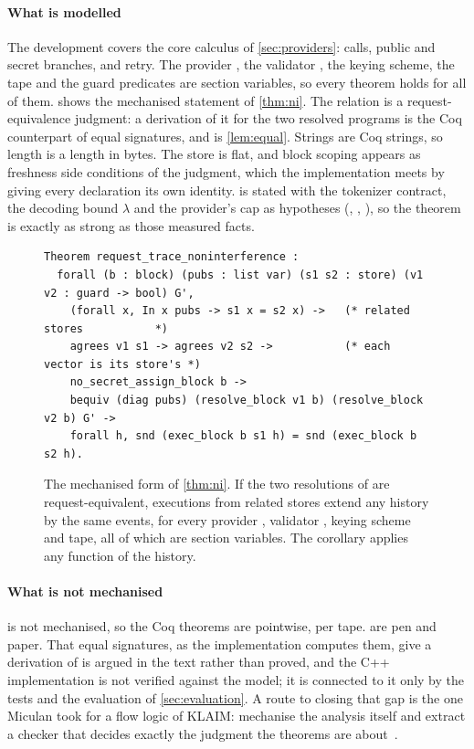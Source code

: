 \paragraph{What is modelled} The development covers the core calculus of
\cref{sec:providers}: calls, public and secret branches, and retry. The provider
, the validator , the keying scheme, the tape and the guard
predicates are section variables, so every theorem holds for all of them.
 shows the mechanised statement of \cref{thm:ni}. The relation
 is a request-equivalence judgment: a derivation of it for the two
resolved programs is the Coq counterpart of equal signatures, and
 is \cref{lem:equal}. Strings are Coq strings, so length is a length
in bytes. The store is flat, and block scoping appears as freshness side conditions
of the judgment, which the implementation meets by giving every declaration its own
identity.  is stated with the tokenizer contract, the decoding bound
$\lambda$ and the provider's cap as hypotheses (, ,
), so the theorem is exactly as strong as those measured facts.

\begin{figure}[t]
\begin{lstlisting}[language={},numbers=none,xleftmargin=0pt,basicstyle=\ttfamily\scriptsize,
  morekeywords={Theorem,forall,Proof,Qed}]
Theorem request_trace_noninterference :
  forall (b : block) (pubs : list var) (s1 s2 : store) (v1 v2 : guard -> bool) G',
    (forall x, In x pubs -> s1 x = s2 x) ->   (* related stores           *)
    agrees v1 s1 -> agrees v2 s2 ->           (* each vector is its store's *)
    no_secret_assign_block b ->
    bequiv (diag pubs) (resolve_block v1 b) (resolve_block v2 b) G' ->
    forall h, snd (exec_block b s1 h) = snd (exec_block b s2 h).
\end{lstlisting}
\caption{The mechanised form of \cref{thm:ni}. If the two resolutions of  are
request-equivalent, executions from related stores extend any history by the same events,
for every provider , validator , keying scheme and tape, all of which are
section variables. The corollary  applies any function of the history.}
\label{fig:coq}
\end{figure}

\paragraph{What is not mechanised}  is not mechanised, so the Coq
theorems are pointwise, per tape. 
are pen and paper. That equal signatures, as the implementation computes them, give a
derivation of  is argued in the text rather than proved, and the C++
implementation is not verified against the model; it is connected to it only by the
tests and the evaluation of \cref{sec:evaluation}. A route to closing that gap is
the one Miculan took for a flow logic of KLAIM: mechanise the analysis itself and
extract a checker that decides exactly the judgment the theorems are
about~\cite{Miculan2027Klaim}.

